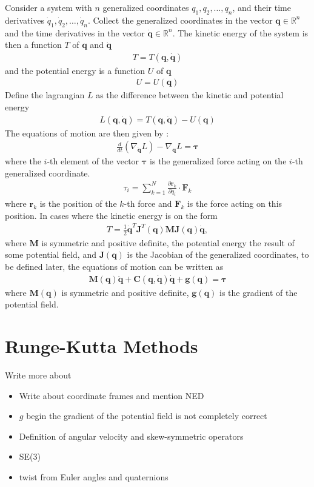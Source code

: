 Consider a system with $n$ generalized coordinates $q_1, q_2, \ldots, q_n$, and
their time derivatives $\dot{q}_1, \dot{q}_2, \ldots, \dot{q}_n$. Collect the
generalized coordinates in the vector $\bm{q} \in \mathbb{R}^n$ and the time
derivatives in the vector $\bm{\dot{q}} \in \mathbb{R}^n$. The kinetic energy
of the system is then a function $T$ of $\bm{q}$ and $\bm{\dot{q}}$
\begin{align}
    T = T(\bm{q}, \bm{\dot{q}})
\end{align}
and the potential energy is a function $U$ of $\bm{q}$
\begin{align}
    U = U(\bm{q})
\end{align}
Define the lagrangian $L$ as the difference between the kinetic and potential
energy
\begin{align}
    L(\bm{q}, \bm{\dot{q}}) = T(\bm{q}, \bm{\dot{q}}) - U(\bm{q})
\end{align}
The equations of motion are then given by \cite{modsim}:
\begin{align}
    \frac{d}{dt} \left( \nabla_{\dot{\bm{q}}} L \right) - \nabla_{\bm{q}} L = \bm{\tau}
\end{align}
where the $i$-th element of the vector $\bm{\tau}$ is the generalized force acting
on the $i$-th generalized coordinate.
\begin{align}
    \tau_i = \sum_{k=1}^N \frac{\partial \bm{r}_k}{\partial q_i} \cdot \bm{F}_k
\end{align}
where $\bm{r}_k$ is the position of the $k$-th force and $\bm{F}_k$ is the force
acting on this position. In cases where the kinetic energy is on the form
\begin{align}
    T = \frac{1}{2} \bm{\dot{q}}^T \bm{J}^T(\bm{q}) \bm{M} \bm{J}(\bm{q}) \bm{\dot{q}},
\end{align}
where $\bm{M}$ is symmetric and positive definite, the potential energy the
result of some potential field, and $\bm{J}(\bm{q})$ is the Jacobian of the
generalized coordinates, to be defined later, the equations of motion can be
written as
\begin{align}
    \bm{M}(\bm{q}) \ddot{\bm{q}} + \bm{C}(\bm{q}, \dot{\bm{q}}) \dot{\bm{q}} + \bm{g}(\bm{q}) = \bm{\tau}
\end{align}
where $\bm{M}(\bm{q})$ is symmetric and positive definite, $\bm{g}(\bm{q})$ is the
gradient of the potential field.

\section{Runge-Kutta Methods}

{\color{red}
Write more about
\begin{itemize}
    \item Write about coordinate frames and mention NED
    \item $g$ begin the gradient of the potential field is not completely correct
    \item Definition of angular velocity and skew-symmetric operators
    \item SE(3)
    \item twist from Euler angles and quaternions
\end{itemize}
}
